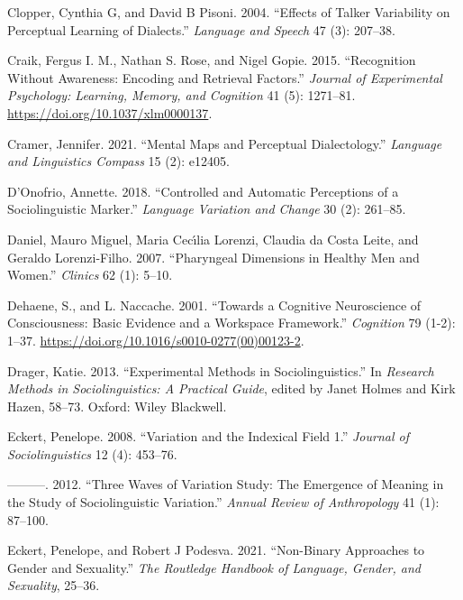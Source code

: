 \documentclass[
  letterpaper,
  DIV=11,
  numbers=noendperiod]{scrartcl}
\newlength{\cslhangindent}
\newenvironment{CSLReferences}[2] %
 {\begin{list}{}{%
  \setlength{\itemindent}{0pt}
  \setlength{\leftmargin}{0pt}
  \setlength{\parsep}{0pt}
  \ifodd #1
   \setlength{\leftmargin}{\cslhangindent}
   \setlength{\itemindent}{-1\cslhangindent}
  \fi
  \setlength{\itemsep}{#2\baselineskip}}}
 {\end{list}}
\begin{document}
\begin{CSLReferences}{1}{0}
Clopper, Cynthia G, and David B Pisoni. 2004. {``Effects of Talker
Variability on Perceptual Learning of Dialects.''} \emph{Language and
Speech} 47 (3): 207--38.

Craik, Fergus I. M., Nathan S. Rose, and Nigel Gopie. 2015.
{``Recognition Without Awareness: {Encoding} and Retrieval Factors.''}
\emph{Journal of Experimental Psychology: Learning, Memory, and
Cognition} 41 (5): 1271--81. \url{https://doi.org/10.1037/xlm0000137}.

Cramer, Jennifer. 2021. {``Mental Maps and Perceptual Dialectology.''}
\emph{Language and Linguistics Compass} 15 (2): e12405.

D'Onofrio, Annette. 2018. {``Controlled and Automatic Perceptions of a
Sociolinguistic Marker.''} \emph{Language Variation and Change} 30 (2):
261--85.

Daniel, Mauro Miguel, Maria Cecı́lia Lorenzi, Claudia da Costa Leite, and
Geraldo Lorenzi-Filho. 2007. {``Pharyngeal Dimensions in Healthy Men and
Women.''} \emph{Clinics} 62 (1): 5--10.

Dehaene, S., and L. Naccache. 2001. {``Towards a Cognitive Neuroscience
of Consciousness: Basic Evidence and a Workspace Framework.''}
\emph{Cognition} 79 (1-2): 1--37.
\url{https://doi.org/10.1016/s0010-0277(00)00123-2}.

Drager, Katie. 2013. {``Experimental Methods in Sociolinguistics.''} In
\emph{Research Methods in Sociolinguistics: A Practical Guide}, edited
by Janet Holmes and Kirk Hazen, 58--73. Oxford: Wiley Blackwell.

Eckert, Penelope. 2008. {``Variation and the Indexical Field 1.''}
\emph{Journal of Sociolinguistics} 12 (4): 453--76.

---------. 2012. {``Three Waves of Variation Study: {The} Emergence of
Meaning in the Study of Sociolinguistic Variation.''} \emph{Annual
Review of Anthropology} 41 (1): 87--100.

Eckert, Penelope, and Robert J Podesva. 2021. {``Non-Binary Approaches
to Gender and Sexuality.''} \emph{The Routledge Handbook of Language,
Gender, and Sexuality}, 25--36.


\end{CSLReferences}
\end{document}
